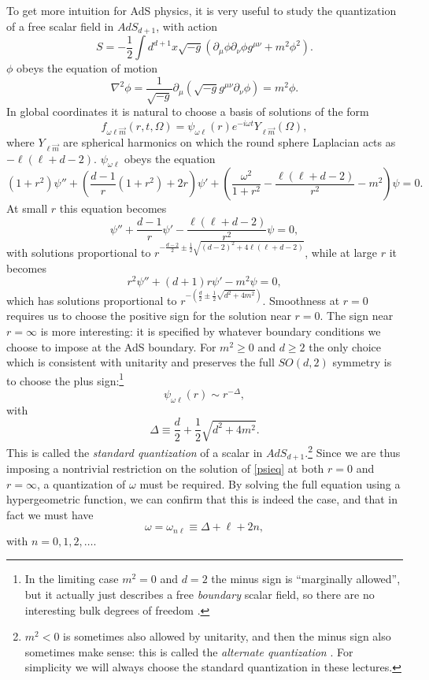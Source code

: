 \documentclass[toc]{PoS}
\newcommand{\be}{\begin{equation}}
\newcommand{\ee}{\end{equation}}
\begin{document}
To get more intuition for AdS physics, it is very useful to study the quantization of a free scalar field in $AdS_{d+1}$, with action
\be
S=-\frac{1}{2}\int d^{d+1}x \sqrt{-g}\left(\partial_\mu \phi \partial_\nu \phi g^{\mu\nu}+m^2 \phi^2\right).
\ee
$\phi$ obeys the equation of motion
\be
\nabla^2\phi=\frac{1}{\sqrt{-g}}\partial_\mu\left(\sqrt{-g}g^{\mu\nu}\partial_\nu \phi\right)=m^2\phi.
\ee
In global coordinates it is natural to choose a basis of solutions of the form
\be
f_{\omega \ell \vec{m}}(r,t,\Omega)=\psi_{\omega \ell}(r)e^{-i\omega t} Y_{\ell \vec{m}}(\Omega),
\ee
where $Y_{\ell \vec{m}}$ are spherical harmonics on which the round sphere Laplacian acts as $-\ell(\ell+d-2)$.  $\psi_{\omega\ell}$ obeys the equation
\be\label{psieq}
(1+r^2)\psi''+\left(\frac{d-1}{r}(1+r^2)+2r\right)\psi'+\left(\frac{\omega^2}{1+r^2}-\frac{\ell(\ell+d-2)}{r^2}-m^2\right)\psi=0.
\ee
At small $r$ this equation becomes
\be
\psi''+\frac{d-1}{r}\psi'-\frac{\ell(\ell+d-2)}{r^2}\psi=0,
\ee
with solutions proportional to $r^{-\frac{d-2}{2}\pm\frac{1}{2}\sqrt{(d-2)^2+4\ell(\ell+d-2)}}$, while at large $r$ it becomes
\be
r^2 \psi''+(d+1)r\psi'-m^2 \psi=0,
\ee
which has solutions proportional to $r^{-\left(\frac{d}{2}\pm \frac{1}{2}\sqrt{d^2+4m^2}\right)}$.  Smoothness at $r=0$ requires us to choose the positive sign for the solution near $r=0$.  The sign near $r=\infty$ is more interesting: it is specified by whatever boundary conditions we choose to impose at the AdS boundary.  For $m^2\geq 0$ and $d\geq 2$ the only choice which is consistent with unitarity and preserves the full $SO(d,2)$ symmetry is to choose the plus sign:\footnote{In the limiting case $m^2=0$ and $d=2$ the minus sign is ``marginally allowed'', but it actually just describes a free \textit{boundary} scalar field, so there are no interesting bulk degrees of freedom \cite{Freivogel:2016zsb}.}
\be
\psi_{\omega \ell}(r)\sim r^{-\Delta},
\ee
with 
\be
\Delta\equiv \frac{d}{2}+\frac{1}{2}\sqrt{d^2+4m^2}.
\ee
This is called the \textit{standard quantization} of a scalar in $AdS_{d+1}$.\footnote{$m^2<0$ is sometimes also allowed by unitarity, and then the minus sign also sometimes make sense: this is called the \textit{alternate quantization} \cite{Breitenlohner:1982jf,Klebanov:1999tb}. For simplicity we will always choose the standard quantization in these lectures.}  Since we are thus imposing a nontrivial restriction on the solution of \eqref{psieq} at both $r=0$ and $r=\infty$, a quantization of $\omega$ must be required.  By solving the full equation using a hypergeometric function, we can confirm that this is indeed the case, and that in fact we must have
\be\label{omegaeq}
\omega=\omega_{n\ell}\equiv \Delta+\ell+2n, 
\ee
with $n=0,1,2,\ldots$.  
\end{document}
